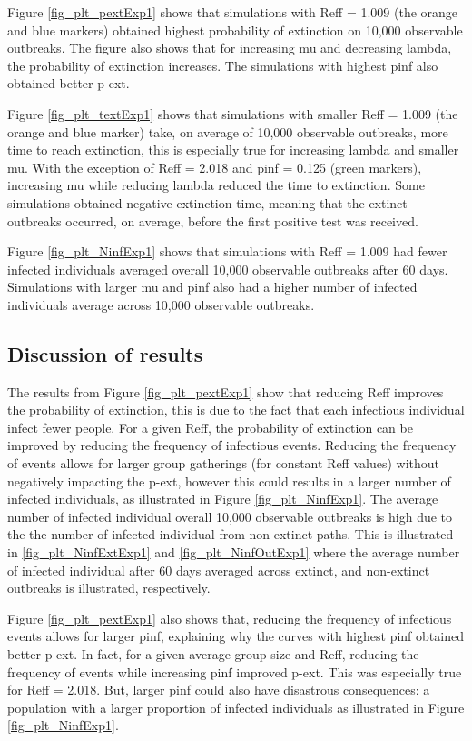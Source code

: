 \documentclass[sr]{drdc-report}
\begin{document}
Figure \ref{fig_plt_pextExp1} shows that simulations with Reff = 1.009 (the orange and blue markers) obtained highest probability of extinction on 10,000 observable outbreaks. The figure also shows that for increasing mu and decreasing lambda, the probability of extinction increases. The simulations with highest pinf also obtained better p-ext. 


Figure \ref{fig_plt_textExp1} shows that simulations with smaller Reff = 1.009 (the orange and blue marker) take, on average of 10,000 observable outbreaks, more time to reach extinction, this is especially true for increasing lambda and smaller mu. With the exception of Reff = 2.018 and pinf = 0.125 (green markers), increasing mu while reducing lambda reduced the time to extinction. Some simulations obtained negative extinction time, meaning that the extinct outbreaks occurred, on average, before the first positive test was received.  


Figure \ref{fig_plt_NinfExp1} shows that simulations with Reff = 1.009 had fewer infected individuals averaged overall 10,000 observable outbreaks after 60 days. Simulations with larger mu and pinf also had a higher number of infected individuals average across 10,000 observable outbreaks. 


\subsection{Discussion of results}
The results from Figure \ref{fig_plt_pextExp1} show that reducing Reff improves the probability of extinction, this is due to the fact that each infectious individual infect fewer people. For a given Reff, the probability of extinction can be improved by reducing the frequency of infectious events. Reducing the frequency of events allows for larger group gatherings (for constant Reff values) without negatively impacting the p-ext, however this could results in a larger number of infected individuals, as illustrated in Figure \ref{fig_plt_NinfExp1}. The average number of infected individual overall 10,000 observable outbreaks is high due to the the number of infected individual from non-extinct paths. This is illustrated in \ref{fig_plt_NinfExtExp1} and \ref{fig_plt_NinfOutExp1} where the average number of infected individual after 60 days averaged across extinct, and non-extinct outbreaks is illustrated, respectively.  

Figure \ref{fig_plt_pextExp1} also shows that, reducing the frequency of infectious events allows for larger pinf, explaining why the curves with highest pinf obtained better p-ext. In fact, for a given average group size and Reff, reducing the frequency of events while increasing pinf improved p-ext. This was especially true for Reff = 2.018. But, larger pinf could also have disastrous consequences: a population with a larger proportion of infected individuals as illustrated in Figure \ref{fig_plt_NinfExp1}.
\end{document}

